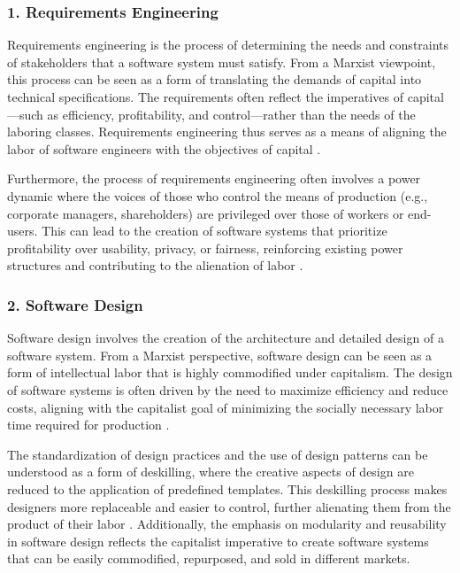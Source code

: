 \begin{refsection}
\begin{multicols}{2}
{\subsubsection*{1. Requirements Engineering}

Requirements engineering is the process of determining the needs and constraints of stakeholders that a software system must satisfy. From a Marxist viewpoint, this process can be seen as a form of translating the demands of capital into technical specifications. The requirements often reflect the imperatives of capital—such as efficiency, profitability, and control—rather than the needs of the laboring classes. Requirements engineering thus serves as a means of aligning the labor of software engineers with the objectives of capital \cite{fuchs2014digital}.

Furthermore, the process of requirements engineering often involves a power dynamic where the voices of those who control the means of production (e.g., corporate managers, shareholders) are privileged over those of workers or end-users. This can lead to the creation of software systems that prioritize profitability over usability, privacy, or fairness, reinforcing existing power structures and contributing to the alienation of labor \cite{braverman1974labor}.

\subsubsection*{2. Software Design}

Software design involves the creation of the architecture and detailed design of a software system. From a Marxist perspective, software design can be seen as a form of intellectual labor that is highly commodified under capitalism. The design of software systems is often driven by the need to maximize efficiency and reduce costs, aligning with the capitalist goal of minimizing the socially necessary labor time required for production \cite{marx1867capital}.

The standardization of design practices and the use of design patterns can be understood as a form of deskilling, where the creative aspects of design are reduced to the application of predefined templates. This deskilling process makes designers more replaceable and easier to control, further alienating them from the product of their labor \cite{braverman1974labor}. Additionally, the emphasis on modularity and reusability in software design reflects the capitalist imperative to create software systems that can be easily commodified, repurposed, and sold in different markets.

}
\end{multicols}
\end{refsection}
